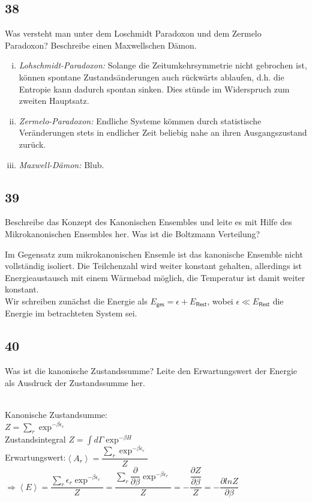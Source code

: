 \documentclass[12pt,a4paper]{report}
\newenvironment{myfrag}{\begin{it}}{\end{it}\vspace{3mm}\par}
\numberwithin{equation}{section}
\begin{document}
\subsection{38}
\begin{myfrag}
Was versteht man unter dem Loschmidt Paradoxon und dem Zermelo Paradoxon?
Beschreibe einen Maxwellschen Dämon.
\end{myfrag}
\begin{enumerate}[(i)]
\item\textit{Lohschmidt-Paradoxon:} Solange die Zeitumkehrsymmetrie nicht gebrochen ist, können spontane Zustandsänderungen auch rückwärts ablaufen, d.h. die Entropie kann dadurch spontan sinken. Dies stünde im Widerspruch zum zweiten Hauptsatz.
\item\textit{Zermelo-Paradoxon:} Endliche Systeme kömmen durch statistische Veränderungen stets in endlicher Zeit beliebig nahe an ihren Ausgangszustand zurück.
\item\textit{Maxwell-Dämon:} Blub.
\end{enumerate}
\subsection{39}
\begin{myfrag}
Beschreibe das Konzept des Kanonischen Ensembles und leite es mit Hilfe des
Mikrokanonischen Ensembles her. Was ist die Boltzmann Verteilung?
\end{myfrag}
Im Gegensatz zum mikrokanonischen Ensemle ist das kanonische Ensemble nicht vollständig isoliert. Die Teilchenzahl wird weiter konstant gehalten, allerdings ist Energieaustausch mit einem Wärmebad möglich, die Temperatur ist damit weiter konstant.\\
Wir schreiben zunächst die Energie als $E_\mathsf{ges}=\epsilon+E_\mathsf{Rest}$, wobei $\epsilon\ll E_\mathsf{Rest}$ die Energie im betrachteten System sei.
\subsection{40}
\begin{myfrag}
Was ist die kanonische Zustandssumme? Leite den Erwartungswert der Energie
als Ausdruck der Zustandssumme her.
\end{myfrag} \quad \\
Kanonische Zustandsumme: \\
$ Z= \sum \limits_r \exp ^{-\beta \epsilon _r} $ \quad \\ Zustandsintegral  $Z = \int d \Gamma \exp ^{-\beta H} $ \\[1ex]
Erwartungswert:$ \left\langle A_r \right\rangle = \dfrac{\sum _r \exp ^{-\beta \epsilon _r}}{Z}$ \\[1ex]
$\Rightarrow \left\langle E \right\rangle = \dfrac{\sum _r \epsilon _r \exp ^{-\beta \epsilon _r}}{Z} = \dfrac{\sum _r \dfrac{\partial}{\partial \beta} \exp ^{-\beta \epsilon _r}}{Z} = -\dfrac{\dfrac{\partial Z}{\partial \beta}}{Z} = - \dfrac{\partial lnZ}{\partial \beta}$
\end{document}
